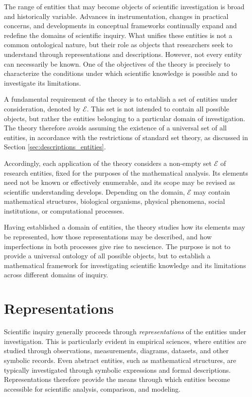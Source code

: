 The range of entities that may become objects of scientific investigation is broad and historically variable. Advances in instrumentation, changes in practical concerns, and developments in conceptual frameworks continually expand and redefine the domains of scientific inquiry. What unifies these entities is not a common ontological nature, but their role as objects that researchers seek to understand through representations and descriptions. However, not every entity can necessarily be known. One of the objectives of the theory is precisely to characterize the conditions under which scientific knowledge is possible and to investigate its limitations.

A fundamental requirement of the theory is to establish a set of entities under consideration, denoted by $\mathcal{E}$. This set is not intended to contain all possible objects, but rather the entities belonging to a particular domain of investigation. The theory therefore avoids assuming the existence of a universal set of all entities, in accordance with the restrictions of standard set theory, as discussed in Section \ref{sec:descriptions_entities}.

Accordingly, each application of the theory considers a non-empty set $\mathcal{E}$ of research entities, fixed for the purposes of the mathematical analysis. Its elements need not be known or effectively enumerable, and its scope may be revised as scientific understanding develops. Depending on the domain, $\mathcal{E}$ may contain mathematical structures, biological organisms, physical phenomena, social institutions, or computational processes.

Having established a domain of entities, the theory studies how its elements may be represented, how those representations may be described, and how imperfections in both processes give rise to nescience. The purpose is not to provide a universal ontology of all possible objects, but to establish a mathematical framework for investigating scientific knowledge and its limitations across different domains of inquiry.

%
%

\section{Representations}

Scientific inquiry generally proceeds through \emph{representations} of the entities under investigation. This is particularly evident in empirical sciences, where entities are studied through observations, measurements, diagrams, datasets, and other symbolic records. Even abstract entities, such as mathematical structures, are typically investigated through symbolic expressions and formal descriptions. Representations therefore provide the means through which entities become accessible for scientific analysis, comparison, and modeling.

